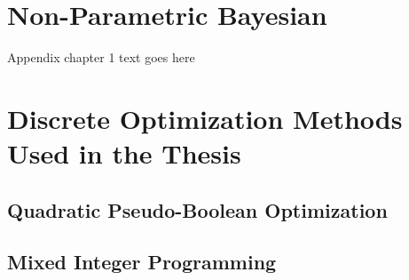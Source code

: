 \chapter{Non-Parametric Bayesian}
Appendix chapter 1 text goes here

\chapter{Discrete Optimization Methods Used in the Thesis}
\section{Quadratic Pseudo-Boolean Optimization}
\section{Mixed Integer Programming}
